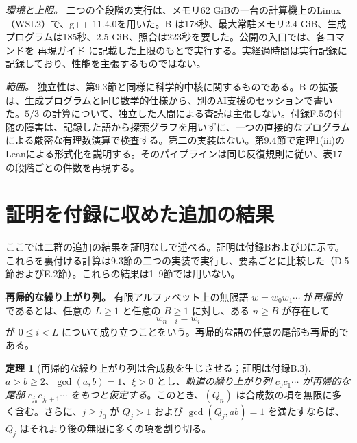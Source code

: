 \documentclass[11pt,reqno]{amsart}
\theoremstyle{definition}
\newtheorem{theorem}{定理}
\theoremstyle{definition}
\theoremstyle{remark}
\begin{document}
\emph{環境と上限。} 二つの全段階の実行は、メモリ62 GiBの一台の計算機上のLinux（WSL2）で、g++ 11.4.0を用いた。B は178秒、最大常駐メモリ2.4 GiB、生成プログラムは185秒、2.5 GiB、照合は223秒を要した。公開の入口では、各コマンドを \href{REPRODUCE.md}{再現ガイド} に記載した上限のもとで実行する。実経過時間は実行記録に記録しており、性能を主張するものではない。

\emph{範囲。} 独立性は、第9.3節と同様に科学的中核に関するものである。B の拡張は、生成プログラムと同じ数学的仕様から、別のAI支援のセッションで書いた。\(5/3\) の計算について、独立した人間による査読は主張しない。付録F.5の付随の障害は、記録した語から探索グラフを用いずに、一つの直接的なプログラムによる厳密な有理数演算で検査する。第二の実装はない。第9.4節で定理1(iii)のLeanによる形式化を説明する。そのパイプラインは同じ反復規則に従い、表17の段階ごとの件数を再現する。

\section{証明を付録に収めた追加の結果}\label{sec:10}

ここでは二群の追加の結果を証明なしで述べる。証明は付録BおよびDに示す。これらを裏付ける計算は9.3節の二つの実装で実行し、要素ごとに比較した（D.5節およびE.2節）。これらの結果は1--9節では用いない。

\textbf{再帰的な繰り上がり列。} 有限アルファベット上の無限語 \(w=w_0w_1\cdots\) が\emph{再帰的}であるとは、任意の \(L\ge1\) と任意の \(B\ge1\) に対し、ある \(n\ge B\) が存在して
\[
w_{n+i}=w_i
\]
が \(0\le i<L\) について成り立つことをいう。再帰的な語の任意の尾部も再帰的である。

\begin{samepage}
\begin{theorem}[再帰的な繰り上がり列は合成数を生じさせる；証明は付録B.3]\leavevmode\label{thm:46}
\(a>b\ge2\)、\(\gcd(a,b)=1\)、\(\xi>0\) とし、\emph{軌道の繰り上がり列 \(c_0c_1\cdots\) が再帰的な尾部} \(c_{j_0}c_{j_0+1}\cdots\) \emph{をもつと仮定する}。このとき、\((Q_n)\) は合成数の項を無限に多く含む。さらに、\(j\ge j_0\) が
\(Q_j>1\) および \(\gcd(Q_j,ab)=1\) を満たすならば、\(Q_j\) はそれより後の無限に多くの項を割り切る。
\label{thm-end:46}
\end{theorem}
\end{samepage}
\end{document}
